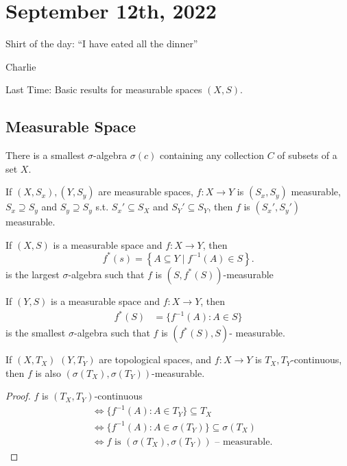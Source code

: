 \section{September 12th, 2022}

\epigraph{Shirt of the day: ``I have eated all the dinner''}{Charlie}

Last Time: Basic results for measurable spaces $(X, S)$.

\subsection{Measurable Space}

\begin{theorem}
  There is a smallest $\sigma$-algebra $\sigma(c)$ containing any collection $C$ of subsets of a set $X$.
\end{theorem}

\begin{lemma}
	If $(X,S_x), (Y,S_y)$ are measurable spaces, $f: X \to Y$ is $(S_x, S_y)$ measurable, $S_x \supseteq S_y$ and $S_y\supseteq S_y$ s.t. $S_x' \subseteq S_X$ and $S_Y' \subseteq S_Y$, then $f$ is $(S_x', S_y')$ measurable.
\end{lemma}

\begin{theorem}
  If $(X, S)$ is a measurable space and $f: X \to Y$, then
	\[
		f^*(s) = \left\{A \subseteq Y \mid f^{-1}(A) \in S \right\}.
	\]
	is the largest $\sigma$-algebra such that $f$ is $(S, f^*(S))$-measurable
\end{theorem}

\begin{theorem}
	If $(Y,S)$ is a measurable space and $f : X \to Y$, then
	 \begin{align*}
		 f^*(S) &= \{f^{-1}(A) : A \in S\}
	\end{align*}
	is the smallest $\sigma$-algebra such that $f$ is $(f^*(S), S)$- measurable.
\end{theorem}

\begin{theorem}
	If $(X, T_X)$ $(Y,T_Y)$ are topological spaces, and  $f : X \to Y$ is $T_X, T_Y$-continuous, then $f$ is also $(\sigma(T_X), \sigma(T_Y))$-measurable.
\end{theorem}

\begin{proof}
	$f$ is $(T_X,T_Y)$-continuous
	\begin{align*}
		&\iff \{f^{-1}(A) : A \in T_Y\} \subseteq T_X \\
		&\iff \{f^{-1}(A) : A \in \sigma(T_Y)\} \subseteq \sigma(T_X) \\
		&\iff f \text{ is } (\sigma(T_X), \sigma(T_Y)) \text{ -- measurable.}
	\end{align*}
\end{proof}

